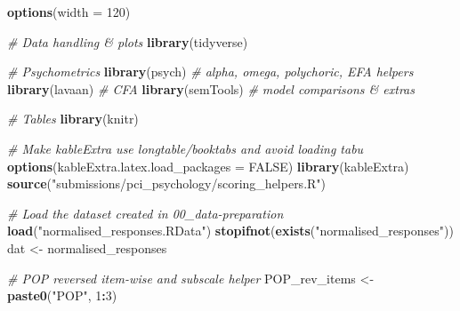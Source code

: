 \documentclass[
  10pt,
]{article}
\newenvironment{Shaded}{\begin{snugshade}}{\end{snugshade}}
\newcommand{\AttributeTok}[1]{\textcolor[rgb]{0.13,0.29,0.53}{#1}}
\newcommand{\CommentTok}[1]{\textcolor[rgb]{0.56,0.35,0.01}{\textit{#1}}}
\newcommand{\ConstantTok}[1]{\textcolor[rgb]{0.56,0.35,0.01}{#1}}
\newcommand{\DecValTok}[1]{\textcolor[rgb]{0.00,0.00,0.81}{#1}}
\newcommand{\FunctionTok}[1]{\textcolor[rgb]{0.13,0.29,0.53}{\textbf{#1}}}
\newcommand{\NormalTok}[1]{#1}
\newcommand{\OtherTok}[1]{\textcolor[rgb]{0.56,0.35,0.01}{#1}}
\newcommand{\SpecialCharTok}[1]{\textcolor[rgb]{0.81,0.36,0.00}{\textbf{#1}}}
\newcommand{\StringTok}[1]{\textcolor[rgb]{0.31,0.60,0.02}{#1}}
\begin{document}
\begin{Shaded}
\begin{Highlighting}[]
\FunctionTok{options}\NormalTok{(}\AttributeTok{width =} \DecValTok{120}\NormalTok{)}

\CommentTok{\# Data handling \& plots}
\FunctionTok{library}\NormalTok{(tidyverse)}

\CommentTok{\# Psychometrics}
\FunctionTok{library}\NormalTok{(psych)        }\CommentTok{\# alpha, omega, polychoric, EFA helpers}
\FunctionTok{library}\NormalTok{(lavaan)       }\CommentTok{\# CFA}
\FunctionTok{library}\NormalTok{(semTools)     }\CommentTok{\# model comparisons \& extras}

\CommentTok{\# Tables}
\FunctionTok{library}\NormalTok{(knitr)}

\CommentTok{\# Make kableExtra use longtable/booktabs and avoid loading tabu}
\FunctionTok{options}\NormalTok{(}\AttributeTok{kableExtra.latex.load\_packages =} \ConstantTok{FALSE}\NormalTok{)}
\FunctionTok{library}\NormalTok{(kableExtra)}
\FunctionTok{source}\NormalTok{(}\StringTok{"submissions/pci\_psychology/scoring\_helpers.R"}\NormalTok{)}

\CommentTok{\# Load the dataset created in 00\_data{-}preparation}
\FunctionTok{load}\NormalTok{(}\StringTok{"normalised\_responses.RData"}\NormalTok{)}
\FunctionTok{stopifnot}\NormalTok{(}\FunctionTok{exists}\NormalTok{(}\StringTok{"normalised\_responses"}\NormalTok{))}
\NormalTok{dat }\OtherTok{\textless{}{-}}\NormalTok{ normalised\_responses}

\CommentTok{\# POP reversed item{-}wise and subscale helper}
\NormalTok{POP\_rev\_items }\OtherTok{\textless{}{-}} \FunctionTok{paste0}\NormalTok{(}\StringTok{"POP"}\NormalTok{, }\DecValTok{1}\SpecialCharTok{:}\DecValTok{3}\NormalTok{)}


\end{Highlighting}
\end{Shaded}
\end{document}
